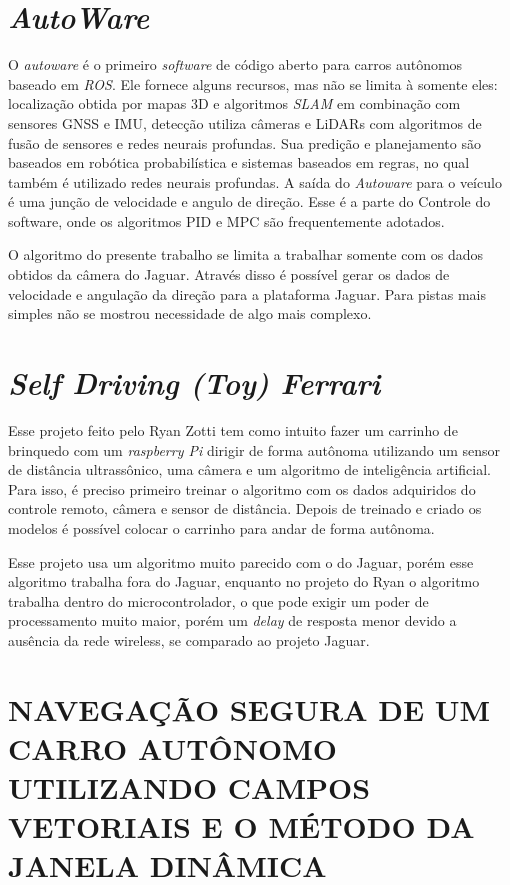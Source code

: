 \section{\textit{AutoWare}}

O \textit{autoware} é o primeiro \textit{software} de código aberto para carros autônomos baseado em \textit{ROS}. Ele fornece alguns recursos, mas não se limita à somente eles: localização obtida por mapas 3D e algoritmos \textit{SLAM} em combinação com sensores GNSS e IMU, detecção utiliza câmeras e LiDARs com algoritmos de fusão de sensores e redes neurais profundas. Sua predição e planejamento são baseados em robótica probabilística e sistemas baseados em regras, no qual também é utilizado redes neurais profundas. A saída do \textit{Autoware} para o veículo é uma junção de velocidade e angulo de direção. Esse é a parte do Controle do software, onde os algoritmos PID e MPC são frequentemente adotados. \cite{autoware}

O algoritmo do presente trabalho se limita a trabalhar somente com os dados obtidos da câmera do Jaguar. Através disso é possível gerar os dados de velocidade e angulação da direção para a plataforma Jaguar. Para pistas mais simples não se mostrou necessidade de algo mais complexo.

\section{\textit{Self Driving (Toy) Ferrari}}
\label{Self_Driving_(Toy)_Ferrari}

Esse projeto feito pelo Ryan Zotti tem como intuito fazer um carrinho de brinquedo com um \textit{raspberry Pi} dirigir de forma autônoma utilizando um sensor de distância ultrassônico, uma câmera e um algoritmo de inteligência artificial. Para isso, é preciso primeiro treinar o algoritmo com os dados adquiridos do controle remoto, câmera e sensor de distância. Depois de treinado e criado os modelos é possível colocar o carrinho para andar de forma autônoma. \cite{selfdrivingcartoy}

Esse projeto usa um algoritmo muito parecido com o do Jaguar, porém esse algoritmo trabalha fora do Jaguar, enquanto no projeto do Ryan o algoritmo trabalha dentro do microcontrolador, o que pode exigir um poder de processamento muito maior, porém um \textit{delay} de resposta menor devido a ausência da rede wireless, se comparado ao projeto Jaguar.

\section{NAVEGAÇÃO SEGURA DE UM CARRO AUTÔNOMO UTILIZANDO CAMPOS VETORIAIS E O MÉTODO DA JANELA DINÂMICA}
\label{NAVEGAÇÃO_SEGURA}

